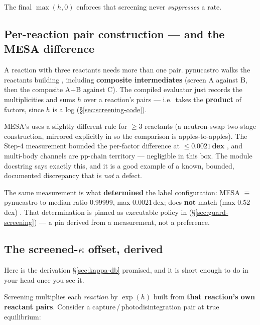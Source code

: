 The final $\max(h,0)$ enforces that screening never \emph{suppresses} a rate.

\subsection{Per-reaction pair construction --- and the MESA difference}
\label{sec:screening-pairs}

A reaction with three reactants needs more than one pair. pynucastro walks the
reactants building , including \textbf{composite
intermediates} (screen A against B, then the composite A$+$B against C). The
compiled evaluator just records the multiplicities and sums $h$ over a
reaction's pairs --- i.e.\ takes the \textbf{product} of factors, since $h$ is a
log (\S\ref{sec:screening-code}).

MESA's  uses a slightly different rule for $\ge3$ reactants (a
neutron-swap two-stage construction, mirrored explicitly in
 so the comparison is apples-to-apples).
The Step-4 measurement bounded the per-factor difference at
\textbf{$\le 0.0021$\,dex} , and multi-body channels are
pp-chain territory --- negligible in this box. The module docstring says exactly
this, and it is a good example of a known, bounded, documented discrepancy that
is \emph{not} a defect.

The same measurement is what \textbf{determined} the label configuration: MESA
 $\equiv$ pynucastro  to
median ratio 0.99999, max 0.0021\,dex;  does \textbf{not}
match (max 0.52\,dex) . That determination is pinned as
executable policy in  (\S\ref{sec:guard-screening}) ---
a pin derived from a measurement, not a preference.

\subsection{The screened-\texorpdfstring{$\kappa$}{kappa} offset, derived}
\label{sec:screened-kappa}

Here is the derivation \S\ref{sec:kappa-db} promised, and it is short enough to
do in your head once you see it.

Screening multiplies each \emph{reaction} by $\exp(h)$ built from \textbf{that
reaction's own reactant pairs}. Consider a
capture\,/\,photodisintegration pair at true equilibrium:

